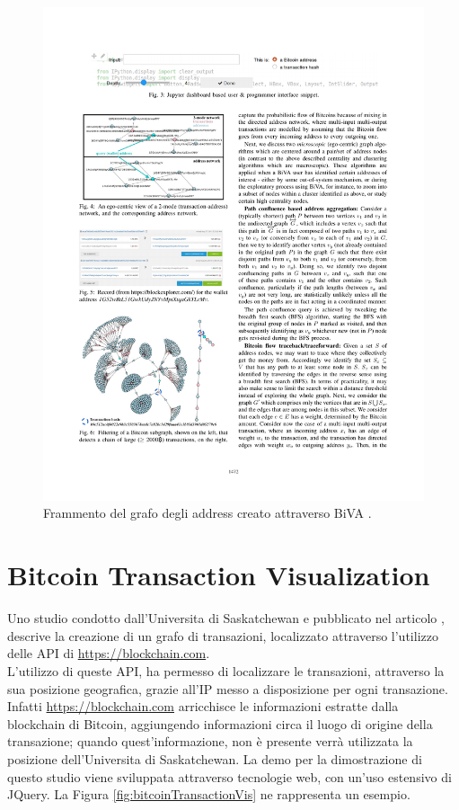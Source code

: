 \begin{figure}
\centering
\includegraphics[scale=1.0]{images/bivaGraph.pdf}
\caption{Frammento del grafo degli address creato attraverso BiVA \cite{DBLP:conf/icdm/OggierPD18}.\label{fig:bivaGraph}}
\end{figure}


\section{Bitcoin Transaction Visualization} \label{sec:bitcoinTransactionVis}

Uno studio condotto dall'Universita di Saskatchewan e pubblicato nel articolo \cite{inproceedings}, descrive la creazione di un grafo di transazioni, localizzato attraverso l'utilizzo delle API di \url{https://blockchain.com}.\\
L'utilizzo di queste API, ha permesso di localizzare le transazioni, attraverso la sua posizione geografica, grazie all'IP messo a disposizione per ogni transazione. Infatti \url{https://blockchain.com} arricchisce le informazioni estratte dalla blockchain di Bitcoin, aggiungendo informazioni circa il luogo di origine della transazione; quando quest'informazione, non è presente verrà utilizzata la posizione dell'Universita di Saskatchewan.
La demo per la dimostrazione di questo studio viene sviluppata attraverso tecnologie web, con un'uso estensivo di JQuery. La Figura \ref{fig:bitcoinTransactionVis} ne rappresenta un esempio.


